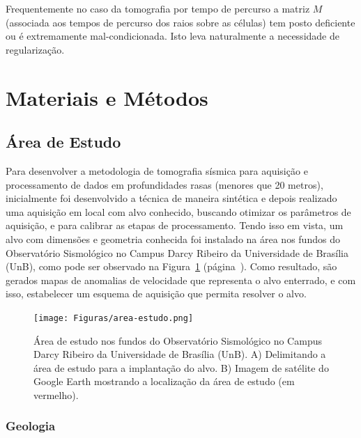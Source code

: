 \documentclass[a4paper, 12 pt]{article} %
\begin{document}
Frequentemente no caso da tomografia por tempo de percurso a matriz $M$ (associada aos tempos de percurso dos raios sobre as células) tem posto deficiente ou é extremamente mal-condicionada. Isto leva naturalmente a necessidade de regularização.


\clearpage

\section{Materiais e Métodos}

\subsection{Área de Estudo}

Para desenvolver a metodologia de tomografia sísmica para aquisição e processamento de dados em profundidades rasas (menores que 20 metros), inicialmente foi desenvolvido a técnica de maneira sintética e depois realizado uma aquisição em local com alvo conhecido, buscando otimizar os parâmetros de aquisição, e para calibrar as etapas de processamento. Tendo isso em vista, um alvo com dimensões e geometria conhecida foi instalado na área nos fundos do Observatório Sismológico no Campus Darcy Ribeiro da Universidade de Brasília (UnB), como pode ser observado na Figura~\ref{area_estudo} (página~\pageref{area_estudo}).
Como resultado, são gerados mapas de anomalias de velocidade que representa o alvo enterrado, e com isso, estabelecer um esquema de aquisição que permita resolver o alvo.

\begin{figure}[!hbtp]
	\begin{center}
		\texttt{[image: Figuras/area-estudo.png]}
	\end{center}
	\caption{Área de estudo nos fundos do Observatório Sismológico no Campus Darcy Ribeiro da Universidade de Brasília (UnB). A) Delimitando a área de estudo para a implantação do alvo. B) Imagem de satélite do Google Earth mostrando a localização da área de estudo (em vermelho).}
	\label{area_estudo}
\end{figure}
\newpage

\clearpage

\subsubsection{Geologia}
\end{document}
